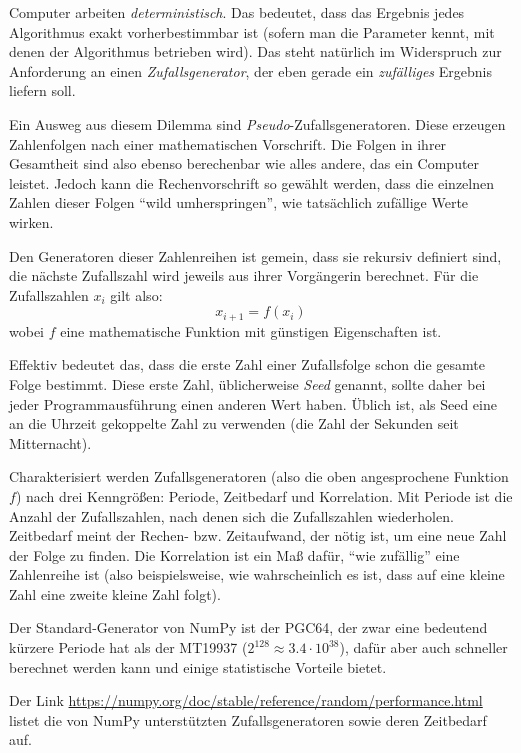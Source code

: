 \begin{hintbox}[Zufallsgeneratoren]
Computer arbeiten \emph{deterministisch}. Das bedeutet, dass das Ergebnis jedes Algorithmus exakt vorherbestimmbar ist (sofern man die Parameter kennt, mit denen der Algorithmus betrieben wird). Das steht natürlich im Widerspruch zur Anforderung an einen \emph{Zufallsgenerator}, der eben gerade ein \emph{zufälliges} Ergebnis liefern soll.

Ein Ausweg aus diesem Dilemma sind \emph{Pseudo}-Zufallsgeneratoren. Diese erzeugen Zahlenfolgen nach einer mathematischen Vorschrift. Die Folgen in ihrer Gesamtheit sind also ebenso berechenbar wie alles andere, das ein Computer leistet. Jedoch kann die Rechenvorschrift so gewählt werden, dass die einzelnen Zahlen dieser Folgen \enquote{wild umherspringen}, \ie wie tatsächlich zufällige Werte wirken.

Den Generatoren dieser Zahlenreihen ist gemein, dass sie rekursiv definiert sind, \ie die nächste Zufallszahl wird jeweils aus ihrer Vorgängerin berechnet. Für die Zufallszahlen $x_i$ gilt also:
\[ x_{i+1} = f(x_i) \]
wobei $f$ eine mathematische Funktion mit günstigen Eigenschaften ist.

Effektiv bedeutet das, dass die erste Zahl einer Zufallsfolge schon die gesamte Folge bestimmt. Diese erste Zahl, üblicherweise \emph{Seed} genannt, sollte daher bei jeder Programmausführung einen anderen Wert haben. Üblich ist, als Seed eine an die Uhrzeit gekoppelte Zahl zu verwenden (\eg die Zahl der Sekunden seit Mitternacht).

Charakterisiert werden Zufallsgeneratoren (also die oben angesprochene Funktion $f$) nach drei Kenngrößen: Periode, Zeitbedarf und Korrelation. Mit Periode ist die Anzahl der Zufallszahlen, nach denen sich die Zufallszahlen wiederholen. Zeitbedarf meint der Rechen- bzw. Zeitaufwand, der nötig ist, um eine neue Zahl der Folge zu finden. Die Korrelation ist ein Maß dafür, \enquote{wie zufällig} eine Zahlenreihe ist (also beispielsweise, wie wahrscheinlich es ist, dass auf eine kleine Zahl eine zweite kleine Zahl folgt).
\end{hintbox}

Der Standard-Generator von NumPy ist der PGC64, der zwar eine bedeutend kürzere Periode hat als der MT19937 ($2^{128} \approx 3.4 \cdot 10^{38}$), dafür aber auch schneller berechnet werden kann und einige statistische Vorteile bietet.

Der Link \url{https://numpy.org/doc/stable/reference/random/performance.html} listet die von NumPy unterstützten Zufallsgeneratoren sowie deren Zeitbedarf auf.

